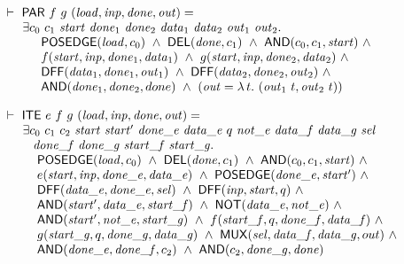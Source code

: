 $
\begin{array}{l}
\TURNST\ \DEF{PAR}\ f\ g\ (\VAR{load,inp,done,out}) = \\
\phantom{\TURNST\ ~}     \exists c_0~c_1~\VAR{start}~\sVAR{done}{1}~\sVAR{done}{2}~
                                 \sVAR{data}{1}~\sVAR{data}{2}~\sVAR{out}{1}~\sVAR{out}{2}.\\
\phantom{\TURNST\ ~~ \exists~}
       \DEF{POSEDGE} (\VAR{load},c_0)\ \AND\  
       \DEF{DEL} (\VAR{done},c_1)\ \AND \ 
       \DEF{AND} (c_0,c_1,\VAR{start})\ \AND\\
\phantom{\TURNST\ ~~ \exists~}
       f (\VAR{start},\VAR{inp},\sVAR{done}{1},\sVAR{data}{1})\ \AND \ 
       g (\VAR{start},\VAR{inp},\sVAR{done}{2},\sVAR{data}{2})\ \AND\\
\phantom{\TURNST\ ~~ \exists~}
       \DEF{DFF} (\sVAR{data}{1},\sVAR{done}{1},\sVAR{out}{1})\ \AND \  
       \DEF{DFF} (\sVAR{data}{2},\sVAR{done}{2},\sVAR{out}{2})\ \AND\\
\phantom{\TURNST\ ~~ \exists~}
       \DEF{AND} (\sVAR{done}{1},\sVAR{done}{2},done)\ \AND \ 
       (\VAR{out} = \LAMBDA{t}{(\sVAR{out}{1}\ t,\sVAR{out}{2}\ t)})
\end{array}
$

$
\begin{array}{l}
\TURNST\ \DEF{ITE}\ e\ f\ g\ (\VAR{load,inp,done,out}) =\\
\phantom{\TURNST\ ~}
   \exists c_0~c_1~c_2~\VAR{start}~\VAR{start'}~\VAR{done\_e}~\VAR{data\_e}~q~ 
                          \VAR{not\_e}~\VAR{data\_f}~\VAR{data\_g}~\VAR{sel}\\
\phantom{\TURNST\ ~\exists }
                  \VAR{done\_f}~\VAR{done\_g}~
                          \VAR{start\_f}~\VAR{start\_g}.\ \\
\phantom{\TURNST\ ~\exists ~}
           \DEF{POSEDGE} (\VAR{load},c_0)\ \AND\
           \DEF{DEL} (\VAR{done},c_1)\ \AND\ \DEF{AND} (c_0,c_1,\VAR{start})\ \AND \\
\phantom{\TURNST\ ~\exists ~}
           e (\VAR{start},\VAR{inp},\VAR{done\_e},\VAR{data\_e})\ \AND\
           \DEF{POSEDGE} (\VAR{done\_e},\VAR{start'})\ \AND \\
\phantom{\TURNST\ ~\exists ~}
           \DEF{DFF} (\VAR{data\_e},\VAR{done\_e},\VAR{sel})\ \AND\
           \DEF{DFF} (\VAR{inp},\VAR{start},q)\ \AND \\
\phantom{\TURNST\ ~\exists ~}
           \DEF{AND} (\VAR{start'},\VAR{data\_e},\VAR{start\_f})\ \AND\
           \DEF{NOT} (\VAR{data\_e},\VAR{not\_e})\ \AND \\
\phantom{\TURNST\ ~\exists ~}
           \DEF{AND} (\VAR{start'},\VAR{not\_e},\VAR{start\_g})\ \AND\
           f (\VAR{start\_f},q,\VAR{done\_f},\VAR{data\_f})\ \AND\\
\phantom{\TURNST\ ~\exists ~}
           g (\VAR{start\_g},q,\VAR{done\_g},\VAR{data\_g})\ \AND\
           \DEF{MUX} (\VAR{sel},\VAR{data\_f},\VAR{data\_g},out)\ \AND \\
\phantom{\TURNST\ ~\exists ~}
           \DEF{AND} (\VAR{done\_e},\VAR{done\_f},c_2)\ \AND\
           \DEF{AND} (c_2,\VAR{done\_g},\VAR{done}) 
\end{array}
$

